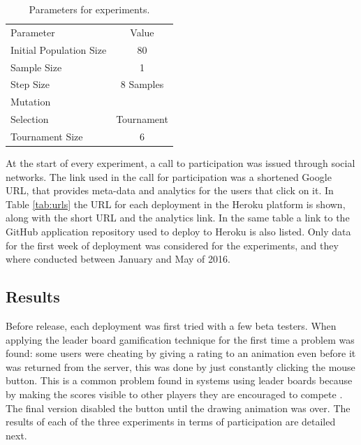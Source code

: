 \begin{table}
  \small
  \caption{ Parameters for experiments.  }
  \label{tab:params} 
  \centering
  \small
  \begin{tabular}{l  c}
    \hline\noalign{\smallskip}
     Parameter & Value \\
    \noalign{\smallskip}\hline\noalign{\smallskip}
    Initial Population Size   & 80 \\ \hline
    Sample Size & 1 \\ \hline
    Step Size & 8 Samples \\ \hline
    Mutation &  \\ \hline
    Selection & Tournament \\ \hline
    Tournament Size &  6 \\ \hline
  \end{tabular}
\end{table}

At the start of every experiment, a call to participation was issued
through social networks.  The link used in the call for participation
was a shortened Google URL, that provides meta-data and analytics for the
users that click on it. %
  In Table \ref{tab:urls} the URL for each 
deployment in the Heroku platform is shown,
along with the short URL and the analytics link. In the same table a link to the GitHub 
application repository used to deploy to Heroku is also listed. Only data 
for the first week of deployment was considered for the experiments, and they where conducted 
between January and May of 2016. 

\subsection{Results} 
Before release, each deployment was first tried with a few beta testers. 
When applying the leader board gamification technique for the first time a 
problem was found: some users were cheating by giving a
rating to an animation even before it was returned from the server, this was done by just
constantly clicking the mouse button. This is a common problem found in systems using leader
boards because by making the scores visible to other players they are encouraged 
to compete \cite{hickman2010total}. The final version disabled the button until 
the drawing animation was over. The results of each of the three experiments in 
terms of participation are detailed next.

